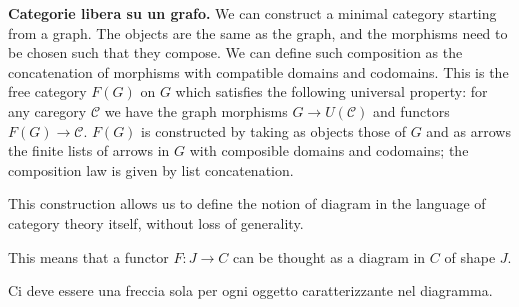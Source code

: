 \documentclass[a4paper]{article}
\begin{document}
\textbf{Categorie libera su un grafo.}
We can construct a minimal category starting from a graph.
The objects are the same as the graph, and the morphisms
need to be chosen such that they compose.
We can define such composition as the concatenation of morphisms
with compatible domains and codomains.
This is the free category \(F(G)\) on \(G\) which satisfies the following universal property:
for any caregory \(\mathcal{C}\)
we have the graph morphisms \(G \to U(\mathcal{C})\)
and functors \(F(G) \to \mathcal{C}\).
\(F(G)\) is constructed by taking as objects those of \(G\)
and as arrows the finite lists of arrows in \(G\)
with composible domains and codomains; the composition law is given by list concatenation.

This construction allows us to define the notion of diagram
in the language of category theory itself, without loss of generality.


This means that a functor \(F \colon J \to C\) can be thought as a diagram in \(C\)
of shape \(J\).

\begin{center}
\end{center}

Ci deve essere una freccia sola per ogni oggetto caratterizzante nel diagramma.
\end{document}
